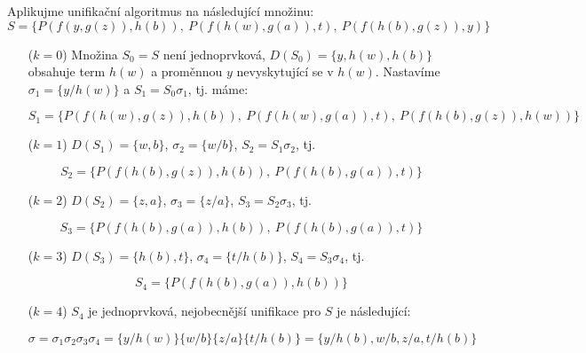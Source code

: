 \begin{example}
Aplikujme unifikační algoritmus na následující množinu: 
$$
S=\{P(f(y,g(z)),h(b)),\ P(f(h(w),g(a)),t),\ P(f(h(b),g(z)),y)\}
$$
\begin{itemize}
    \item[($k=0$)] Množina $S_0=S$ není jednoprvková, $D(S_0)=\{y,h(w),h(b)\}$ obsahuje term $h(w)$ a proměnnou $y$ nevyskytující se v $h(w)$. Nastavíme $\sigma_1=\{y/h(w)\}$ a $S_1=S_0\sigma_1$, tj. máme:
    
    $$S_1=\{P(f(h(w),g(z)),h(b)),\ P(f(h(w),g(a)),t),\ P(f(h(b),g(z)),h(w))\}$$

    \item[($k=1$)] $D(S_1)=\{w,b\}$, $\sigma_2=\{w/b\}$, $S_2=S_1\sigma_2$, tj.
    
    $$S_2=\{P(f(h(b),g(z)),h(b)),\ P(f(h(b),g(a)),t)\}$$
        
    \item[($k=2$)] $D(S_2)=\{z,a\}$, $\sigma_3=\{z/a\}$, $S_3=S_2\sigma_3$, tj.
    
    $$S_3=\{P(f(h(b),g(a)),h(b)),\ P(f(h(b),g(a)),t)\}$$

    \item[($k=3$)] $D(S_3)=\{h(b),t\}$, $\sigma_4=\{t/h(b)\}$, $S_4=S_3\sigma_4$, tj.
    
    $$S_4=\{P(f(h(b),g(a)),h(b))\}$$

    \item[($k=4$)] $S_4$ je jednoprvková, nejobecnější unifikace pro $S$ je následující:
    
    $$
    \sigma=\sigma_1\sigma_2\sigma_3\sigma_4=\{y/h(w)\}\{w/b\}\{z/a\}\{t/h(b)\}=\{y/h(b),w/b,z/a,t/h(b)\}
    $$
\end{itemize}     
\end{example}

